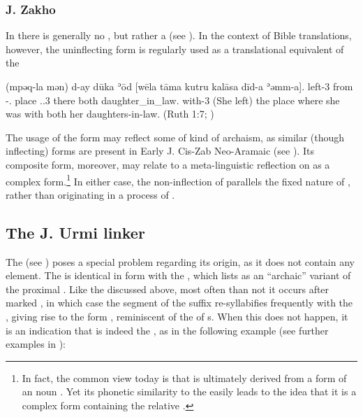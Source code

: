 {\subsubsection{J. Zakho} \label{ss:JZax_od}


In \JZax there is generally no  \lnk*, but rather a  \lnk* (see ). In the context of Bible translations, however, the uninflecting form  is regularly used as a translational equivalent of the  \rel* {} \parencites[\texthebrew{}]{SabarGenesis}[152]{GoldenbergZaken}

{(mpəq-la mən) d-ay dūka ʾōd [wēla tāma kutru kalāsa dīd-a ʾəmm-a].} 
{left-3\fem{} from \gen-\dem.\fem{} place \lnk{} \cop.\pst.3\fem{} there both daughter\_in\_law.\pl{} \fem{} with-3\fem} 
{(She left) the place where she was with both her daughters-in-law.} 
{}{(Ruth 1:7; \cite[153]{GoldenbergZaken})}


The usage of the  form  may reflect some of kind of archaism, 
as similar (though inflecting) forms are present in Early J. Cis-Zab Neo-Aramaic (see ). Its composite form, moreover, may relate to a meta-linguistic reflection on  as a complex form.\footnote{In fact, the common view today is that  is ultimately derived from a \cst* form of an  noun   \citep[59]{KleinHebrew}. Yet  its phonetic similarity to the \rel* {} easily leads to the idea that it is a complex form containing the relative \citep[cf.][465, \S 138, fn.\ 1]{Gesenius}.} In either case, the non-inflection of  parallels the fixed nature of , rather than originating in a process of .

\subsection{The J. Urmi  linker} \label{ss:JUrm_ay}

The \JUrm \lnk* {} (see ) poses a special problem regarding its origin, as it does not contain any  element. The \lnk* is identical in form with the \dem* {}, which \citet[58]{GarbellUrmi} lists as an \enquote{archaic} variant of the \sg* proximal \dem* {}. Like the \Koy \lnk* discussed above, most often than not it occurs after \cst* marked \prims, in which case the  segment of the \cst* suffix re-syllabifies frequently with the \lnk*, giving rise to the form , reminiscent of the  of \dem*s. When this does not happen, it is an indication that  is indeed the \lnk*, as in the following example (see further examples in ):

}
